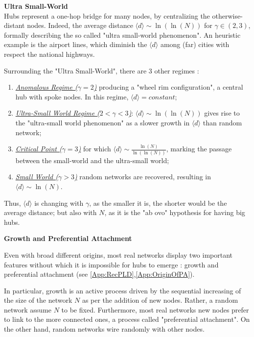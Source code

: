 \documentclass[a4paper,10pt,twoside]{book} %
\theoremstyle{definition}
\begin{document}
{\large \textbf{Ultra Small-World}} \\
Hubs represent a one-hop bridge for many nodes, by centralizing the otherwise-distant nodes. Indeed, the average distance $\langle d \rangle \sim \ln(\ln(N))$ for $\gamma \in (2,3)$, formally describing the so called "ultra small-world phenomenon". An heuristic example is the airport lines, which diminish the \(\langle d \rangle\) among (far) cities with respect the national highways.

Surrounding the "Ultra Small-World", there are $3$ other regimes
\cite{Cohen:2003_SFUSW}:
\begin{enumerate}
	\item \underline{\textit{Anomalous Regime ($\gamma = 2$)}} producing a "wheel rim configuration", 
	a central hub with spoke nodes. In this regime, $\langle d \rangle = constant$;
	\item \underline{\textit{Ultra-Small World Regime ($2 < \gamma < 3$)}}: $\langle d \rangle \sim \ln(\ln(N))$ gives rise to the "ultra-small world phenomenon" as a slower growth in $\langle d \rangle$ than random network;
	\item \underline{\textit{Critical Point ($\gamma = 3$)}} for which $\langle d \rangle \sim \frac{\ln(N)}{\ln(\ln(N))}$, marking the passage between the small-world and the ultra-small world;
	\item \underline{\textit{Small World ($\gamma > 3$)}} random networks are recovered, resulting in $\langle d \rangle \sim \ln(N)$.
\end{enumerate}
Thus, \(\langle d \rangle\) is changing with $\gamma$, as the smaller it is, the shorter would be the average distance; but also with $N$, as it is the "ab ovo" hypothesis for having big hubs.

{\large \textbf{Growth and Preferential Attachment}} 

Even with broad different origins, most real networks display two important features without which it is impossible for hubs to emerge \cite{barabasi::2016networkbook}: growth and preferential attachment (see \autoref{App:RecPLD},\autoref{App:OriginOfPA}). 

In particular, growth is an active process driven by the sequential increasing of the size of the network $N$ as per the addition of new nodes. Rather, a random network assume $N$ to be fixed. \newline
Furthermore, most real networks new nodes prefer to link to the more connected ones, a process called "preferential attachment". On the other hand, random networks wire randomly with other nodes.
\end{document}
